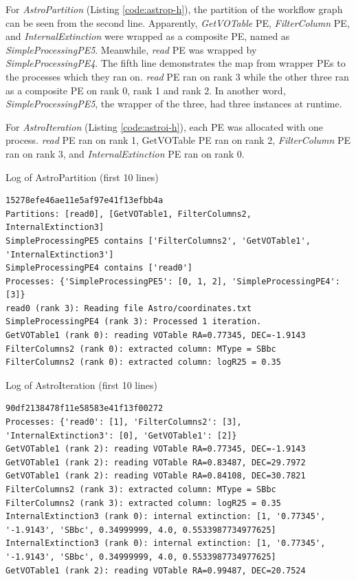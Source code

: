 \documentclass[10pt,twoside,openright,logo]{report}
\begin{document}
For \textit{AstroPartition} (Listing \ref{code:astrop-h}), the partition of the workflow graph can be seen from the second line. Apparently, \textit{GetVOTable} PE, \textit{FilterColumn} PE, and \textit{InternalExtinction} were wrapped as a composite PE, named as \textit{SimpleProcessingPE5}. Meanwhile, \textit{read} PE was wrapped by \textit{SimpleProcessingPE4}. The fifth line demonstrates the map from wrapper PEs to the processes which they ran on. \textit{read} PE ran on rank 3 while the other three ran as a composite PE on rank 0, rank 1 and rank 2. In another word, \textit{SimpleProcessingPE5}, the wrapper of the three, had three instances at runtime.

For \textit{AstroIteration} (Listing \ref{code:astroi-h}), each PE was allocated with one process. \textit{read} PE ran on rank 1, {GetVOTable} PE ran on rank 2, \textit{FilterColumn} PE ran on rank 3, and \textit{InternalExtinction} PE ran on rank 0.

\begin{listing}
\caption{Log of AstroPartition (first 10 lines)}
\label{code:astrop-h}
\begin{verbatim}
15278efe46ae11e5af97e41f13efbb4a
Partitions: [read0], [GetVOTable1, FilterColumns2, InternalExtinction3]
SimpleProcessingPE5 contains ['FilterColumns2', 'GetVOTable1', 'InternalExtinction3']
SimpleProcessingPE4 contains ['read0']
Processes: {'SimpleProcessingPE5': [0, 1, 2], 'SimpleProcessingPE4': [3]}
read0 (rank 3): Reading file Astro/coordinates.txt
SimpleProcessingPE4 (rank 3): Processed 1 iteration.
GetVOTable1 (rank 0): reading VOTable RA=0.77345, DEC=-1.9143
FilterColumns2 (rank 0): extracted column: MType = SBbc
FilterColumns2 (rank 0): extracted column: logR25 = 0.35
\end{verbatim}
\end{listing}

\begin{listing}
\caption{Log of AstroIteration (first 10 lines)}
\label{code:astroi-h}
\begin{verbatim}
90df2138478f11e58583e41f13f00272
Processes: {'read0': [1], 'FilterColumns2': [3], 'InternalExtinction3': [0], 'GetVOTable1': [2]}
GetVOTable1 (rank 2): reading VOTable RA=0.77345, DEC=-1.9143
GetVOTable1 (rank 2): reading VOTable RA=0.83487, DEC=29.7972
GetVOTable1 (rank 2): reading VOTable RA=0.84108, DEC=30.7821
FilterColumns2 (rank 3): extracted column: MType = SBbc
FilterColumns2 (rank 3): extracted column: logR25 = 0.35
InternalExtinction3 (rank 0): internal extinction: [1, '0.77345', '-1.9143', 'SBbc', 0.34999999, 4.0, 0.5533987734977625]
InternalExtinction3 (rank 0): internal extinction: [1, '0.77345', '-1.9143', 'SBbc', 0.34999999, 4.0, 0.5533987734977625]
GetVOTable1 (rank 2): reading VOTable RA=0.99487, DEC=20.7524
\end{verbatim}
\end{listing}
\end{document}
